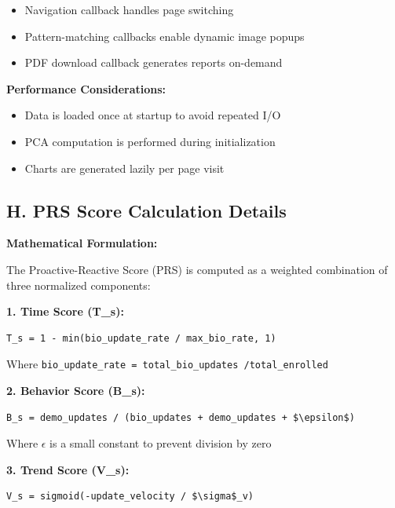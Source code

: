 \documentclass[11pt, a4paper]{article}
\begin{document}
\begin{itemize}
\item Navigation callback handles page switching

\item Pattern-matching callbacks enable dynamic image popups

\item PDF download callback generates reports on-demand
\end{itemize}

\textbf{Performance Considerations:}


\begin{itemize}
\item Data is loaded once at startup to avoid repeated I/\allowbreak O

\item PCA computation is performed during initialization

\item Charts are generated lazily per page visit
\end{itemize}

\subsection{H. PRS Score Calculation Details}

\textbf{Mathematical Formulation:}


The Proactive-Reactive Score (PRS) is computed as a weighted combination of three normalized components:


\textbf{1. Time Score (T\_s):}


\begin{lstlisting}
T_s = 1 - min(bio_update_rate / max_bio_rate, 1)
\end{lstlisting}

Where \texttt{bio\_update\_rate = total\_bio\_updates /\allowbreak  total\_enrolled}


\textbf{2. Behavior Score (B\_s):}


\begin{lstlisting}
B_s = demo_updates / (bio_updates + demo_updates + $\epsilon$)
\end{lstlisting}

Where $\epsilon$ is a small constant to prevent division by zero


\textbf{3. Trend Score (V\_s):}


\begin{lstlisting}
V_s = sigmoid(-update_velocity / $\sigma$_v)
\end{lstlisting}
\end{document}
